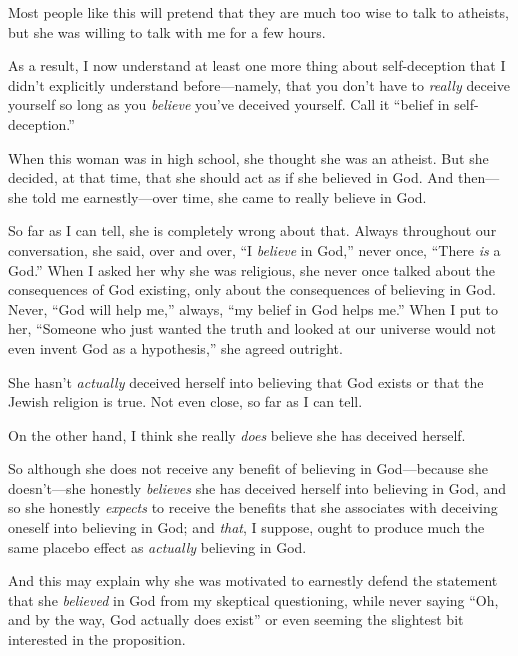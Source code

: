 {
 Most people like this will pretend that they are much too wise to
talk to atheists, but she was willing to talk with me for a few hours.}

{
 As a result, I now understand at least one more thing about
self-deception that I didn't explicitly understand
before---namely, that you don't have to \textit{really}
deceive yourself so long as you \textit{believe} you've
deceived yourself. Call it ``belief in
self-deception.''}

{
 When this woman was in high school, she thought she was an
atheist. But she decided, at that time, that she should act as if she
believed in God. And then---she told me earnestly---over time, she came
to really believe in God.}

{
 So far as I can tell, she is completely wrong about that. Always
throughout our conversation, she said, over and over,
``I \textit{believe} in God,'' never
once, ``There \textit{is} a God.''
When I asked her why she was religious, she never once talked about the
consequences of God existing, only about the consequences of believing
in God. Never, ``God will help me,''
always, ``my belief in God helps
me.'' When I put to her, ``Someone
who just wanted the truth and looked at our universe would not even
invent God as a hypothesis,'' she agreed outright.}

{
 She hasn't \textit{actually} deceived herself into
believing that God exists or that the Jewish religion is true. Not even
close, so far as I can tell.}

{
 On the other hand, I think she really \textit{does} believe she
has deceived herself.}

{
 So although she does not receive any benefit of believing in
God---because she doesn't---she honestly
\textit{believes} she has deceived herself into believing in God, and
so she honestly \textit{expects} to receive the benefits that she
associates with deceiving oneself into believing in God; and
\textit{that}, I suppose, ought to produce much the same placebo effect
as \textit{actually} believing in God.}

{
 And this may explain why she was motivated to earnestly defend the
statement that she \textit{believed} in God from my skeptical
questioning, while never saying ``Oh, and by the way,
God actually does exist'' or even seeming the
slightest bit interested in the proposition.}

\myendsectiontext


